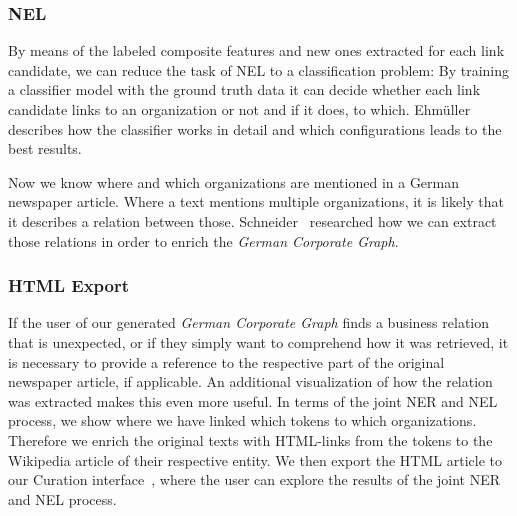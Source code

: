 \subsubsection{NEL}
By means of the labeled composite features and new ones extracted for each link candidate, we can reduce the task of NEL to a classification problem: By training a classifier model with the ground truth data it can decide whether each link candidate links to an organization or not and if it does, to which. Ehmüller~\cite{ehmueller} describes how the classifier works in detail and which configurations leads to the best results.

Now we know where and which organizations are mentioned in a German newspaper article. Where a text mentions multiple organizations, it is likely that it describes a relation between those. Schneider~\cite{schneider} researched how we can extract those relations in order to enrich the \textit{German Corporate Graph}.\\


\subsubsection{HTML Export}
If the user of our generated \textit{German Corporate Graph} finds a business relation that is unexpected, or if they simply want to comprehend how it was retrieved, it is necessary to provide a reference to the respective part of the original newspaper article, if applicable. An additional visualization of how the relation was extracted makes this even more useful. In terms of the joint NER and NEL process, we show where we have linked which tokens to which organizations. Therefore we enrich the original texts with HTML-links from the tokens to the Wikipedia article of their respective entity. We then export the HTML article to our Curation interface~\cite{gruner}, where the user can explore the results of the joint NER and NEL process.\\
